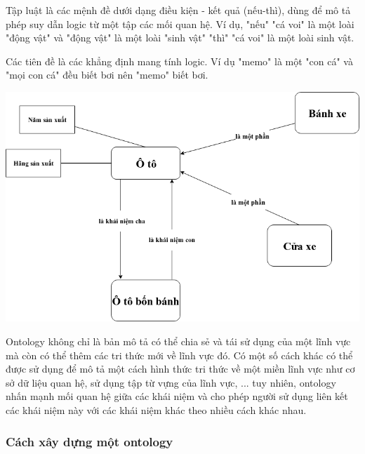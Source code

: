 Tập luật  là các mệnh đề dưới dạng điều kiện - kết quả (nếu-thì), dùng để mô tả phép suy dẫn logic từ một tập các mối quan hệ. Ví dụ, "nếu" "cá voi" là một loài "động vật"  và "động vật" là một loài "sinh vật" "thì" "cá voi" là một loài sinh vật.

Các tiên đề là các khẳng định mang tính logic. Ví dụ "memo" là một "con cá" và "mọi con cá" đều biết bơi nên "memo" biết bơi. 

\begin{center}
	\includegraphics[scale=0.6]{image/otology_example}
\end{center}

Ontology không chỉ là bản mô tả có thể chia sẻ và tái sử dụng của một lĩnh vực mà còn có thể thêm các tri thức mới về lĩnh vực đó. 
Có một số cách khác có thể được sử dụng để mô tả một cách hình thức tri thức về một miền lĩnh vực như cơ sở dữ liệu quan hệ, sử dụng tập từ vựng của lĩnh vực, ... tuy nhiên, ontology nhấn mạnh mối quan hệ giữa các khái niệm và cho phép người sử dụng liên kết các khái niệm này với các khái niệm khác theo nhiều cách khác nhau. 

\subsubsection{Cách xây dựng một ontology}

